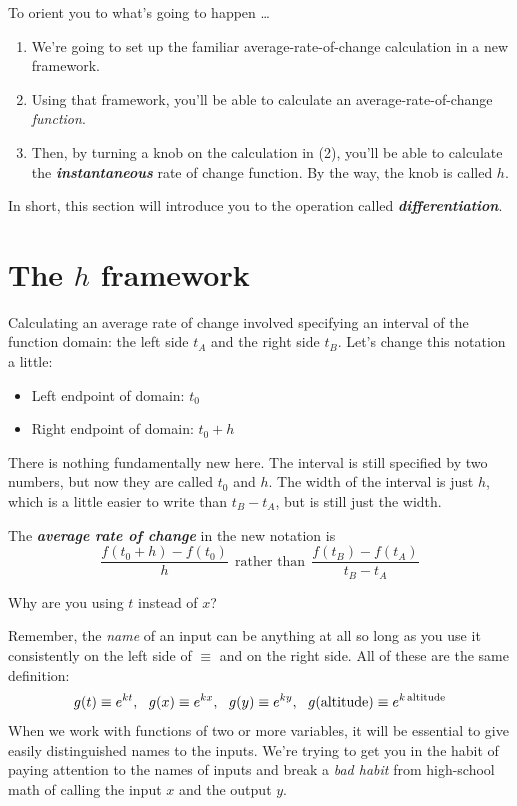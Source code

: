 \documentclass[
]{book}
\providecommand{\tightlist}{%
  \setlength{\itemsep}{0pt}\setlength{\parskip}{0pt}}
\begin{document}
To orient you to what's going to happen \ldots{}

\begin{enumerate}
\def\labelenumi{\arabic{enumi}.}
\tightlist
\item
  We're going to set up the familiar average-rate-of-change calculation in a new framework.
\item
  Using that framework, you'll be able to calculate an average-rate-of-change \emph{function}.
\item
  Then, by turning a knob on the calculation in (2), you'll be able to calculate the \textbf{\emph{instantaneous}} rate of change function. By the way, the knob is called \(h\).
\end{enumerate}

In short, this section will introduce you to the operation called \textbf{\emph{differentiation}}.

\hypertarget{the-h-framework}{%
\section{\texorpdfstring{The \(h\) framework}{The h framework}}\label{the-h-framework}}

Calculating an average rate of change involved specifying an interval of the function domain: the left side \(t_A\) and the right side \(t_B\). Let's change this notation a little:

\begin{itemize}
\tightlist
\item
  Left endpoint of domain: \(t_0\)
\item
  Right endpoint of domain: \(t_0 + h\)
\end{itemize}

There is nothing fundamentally new here. The interval is still specified by two numbers, but now they are called \(t_0\) and \(h\). The width of the interval is just \(h\), which is a little easier to write than \(t_B - t_A\), but is still just the width.

The \textbf{\emph{average rate of change}} in the new notation is \[\frac{f(t_0 + h) - f(t_0)}{h}\ \ \mbox{rather than}\ \ \frac{f(t_B) - f(t_A)}{t_B - t_A}\]

Why are you using \(t\) instead of \(x\)?

Remember, the \emph{name} of an input can be anything at all so long as you use it consistently on the left side of \(\equiv\) and on the right side. All of these are the same definition:
\[g(t) \equiv e^{kt},\ \ g(x) \equiv e^{kx},\ \ g(y) \equiv e^{ky},\ \ g(\mbox{altitude}) \equiv e^{k\,{\small{\text{altitude}}}}\]
When we work with functions of two or more variables, it will be essential to give easily distinguished names to the inputs. We're trying to get you in the habit of paying attention to the names of inputs and break a \emph{bad habit} from high-school math of calling the input \(x\) and the output \(y\).
\end{document}
